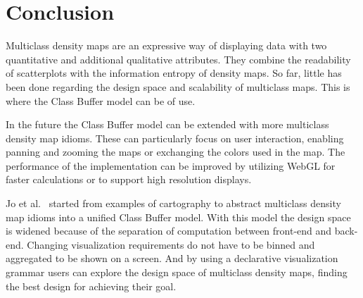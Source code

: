 \section{Conclusion}

Multiclass density maps are an expressive way of displaying data with two quantitative and additional qualitative attributes. They combine the readability of scatterplots with the information entropy of density maps. So far, little has been done regarding the design space and scalability of multiclass maps. This is where the Class Buffer model can be of use.

In the future the Class Buffer model can be extended with more multiclass density map idioms. These can particularly focus on user interaction, enabling panning and zooming the maps or exchanging the colors used in the map. The performance of the implementation can be improved by utilizing WebGL for faster calculations or to support high resolution displays. 

Jo et al.~\cite{jo2019declarative} started from examples of cartography to abstract multiclass density map idioms into a unified Class Buffer model. With this model the design space is widened because of the separation of computation between front-end and back-end. Changing visualization requirements do not have to be binned and aggregated to be shown on a screen. And by using a declarative visualization grammar users can explore the design space of multiclass density maps, finding the best design for achieving their goal.

